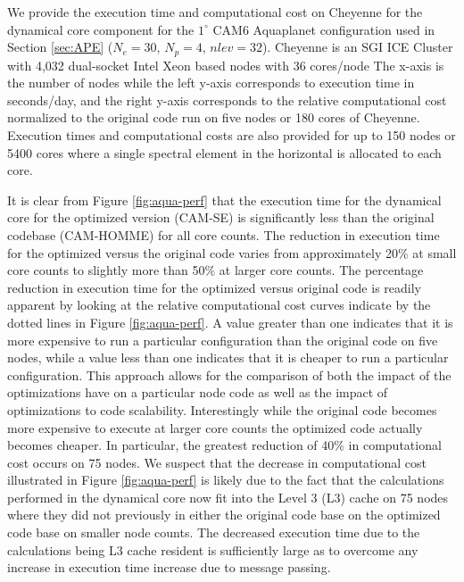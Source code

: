 \documentclass{agujournal}
\begin{document}
We provide the execution time and computational cost on Cheyenne for the dynamical core component for the $1^\circ$ CAM6 Aquaplanet configuration used in Section \ref{sec:APE} ($N_e=30$, $N_p=4$, $nlev=32$). Cheyenne is an SGI ICE Cluster with 4,032 dual-socket Intel Xeon based nodes with 36 cores/node   The x-axis is the number of nodes while the left y-axis corresponds to execution time in seconds/day, and the right y-axis corresponds to the relative computational cost normalized to the original code run on five nodes or 180 cores of Cheyenne. Execution times and computational costs are also provided for up to 150 nodes or 5400 cores where a single spectral element in the horizontal is allocated to each core.

It is clear from Figure \ref{fig:aqua-perf} that the execution time for the dynamical core for the optimized version (CAM-SE) is significantly less than the original codebase (CAM-HOMME) for all core counts. The reduction in execution time for the optimized versus the original code varies from approximately 20\% at small core counts to slightly more than 50\% at larger core counts. The percentage reduction in execution time for the optimized versus original code is readily apparent by looking at the relative computational cost curves indicate by the dotted lines in Figure \ref{fig:aqua-perf}.  A value greater than one indicates that it is more expensive to run a particular configuration than the original code on five nodes, while a value less than one indicates that it is cheaper to run a particular configuration.  This approach allows for the comparison of both the impact of the optimizations have on a particular node code as well as the impact of optimizations to code scalability.  Interestingly while the original code becomes more expensive to execute at larger core counts the optimized code actually becomes cheaper.  In particular, the greatest reduction of 40\% in computational cost occurs on 75 nodes.  We suspect that the decrease in computational cost illustrated in Figure \ref{fig:aqua-perf} is likely due to the fact that the calculations performed in the dynamical core now fit into the Level 3 (L3) cache on 75 nodes where they did not previously in either the original code base on the optimized code base on smaller node counts.  The decreased execution time due to the calculations being L3 cache resident is sufficiently large as to overcome any increase in execution time increase due to message passing.  
\end{document}
